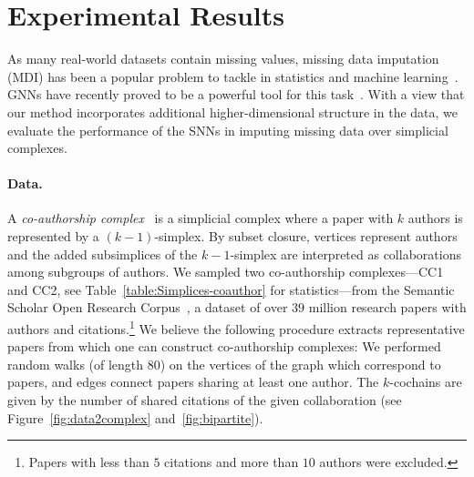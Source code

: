 \section{Experimental Results}

As many real-world datasets contain missing values, missing data imputation (MDI) has been a popular problem to tackle in statistics and machine learning~\cite{little1986statistical, nelwamondo2007missing}.
GNNs have recently proved to be a powerful tool for this task~\cite{spinelli2020neural}.
With a view that our method incorporates additional higher-dimensional structure in the data, we evaluate the performance of the SNNs in imputing missing data over simplicial complexes.

\paragraph{Data.}
A \emph{co-authorship complex}~\cite{patania2017} is a simplicial complex where a paper with $k$ authors is represented by a $(k-1)$-simplex.
By subset closure, vertices represent authors and the added subsimplices of the $k-1$-simplex are interpreted as collaborations among subgroups of authors. We sampled two co-authorship complexes---CC1 and CC2, see Table~\ref{table:Simplices-coauthor} for statistics---from the Semantic Scholar Open Research Corpus~\cite{ammar18NAACL}, a dataset of over $39$ million research papers with authors and citations.\footnote{Papers with less than $5$ citations and more than $10$ authors were excluded.}
We believe the following procedure extracts representative papers from which one can construct co-authorship complexes: We performed random walks (of length $80$) on the vertices of the graph which correspond to papers, and edges connect papers sharing at least one author. 
The $k$-cochains are given by the number of shared citations of the given collaboration (see Figure~\ref{fig:data2complex} and~\ref{fig:bipartite}).

